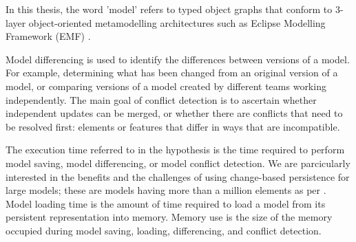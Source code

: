 In this thesis, the word 'model' refers to typed object graphs that conform to 3-layer object-oriented metamodelling architectures such as Eclipse Modelling Framework (EMF) \cite{eclipse2019emf}. 

Model differencing is used to identify the differences between versions of a model. For example, determining what has been changed from an original version of a model, or comparing versions of a model created by different teams working independently. The main goal of conflict detection is to ascertain whether independent updates can be merged, or whether there are conflicts that need to be resolved first: elements or features that differ in ways that are incompatible. 

The execution time referred to in the hypothesis is the time required to perform model saving, model differencing, or model conflict detection. We are parcicularly interested in the benefits and the challenges of using change-based persistence for large models; these are models having more than a million elements as per \cite{daniel2016neoemf,DBLP:conf/models/Espinazo-PaganCM11}. Model loading time is the amount of time required to load a model from its persistent representation into memory. Memory use is the size of the memory occupied during model saving, loading, differencing, and conflict detection.

